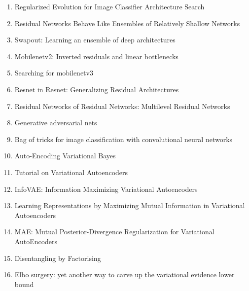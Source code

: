 \documentclass[acmlarge]{acmart}
\begin{document}
\begin{enumerate}
	\item Regularized Evolution for Image Classifier Architecture Search \cite{Real2019RegularizedEF} 

	\item Residual Networks Behave Like Ensembles of Relatively Shallow Networks \cite{Veit2016ResidualNB} 

	\item Swapout: Learning an ensemble of deep architectures \cite{Singh2016SwapoutLA} 

	\item Mobilenetv2: Inverted residuals and linear bottlenecks \cite{sandler2018mobilenetv2} 

	\item Searching for mobilenetv3 \cite{howard2019searching} 

	\item Resnet in Resnet: Generalizing Residual Architectures \cite{Targ2016ResnetIR} 

	\item Residual Networks of Residual Networks: Multilevel Residual Networks \cite{Zhang2018ResidualNO} 

	\item Generative adversarial nets \cite{goodfellow2014generative} 

	\item Bag of tricks for image classification with convolutional neural networks \cite{he2019bag} 

	\item Auto-Encoding Variational Bayes \cite{Kingma2014AutoEncodingVB} 

	\item Tutorial on Variational Autoencoders \cite{Doersch2016TutorialOV} 

	\item InfoVAE: Information Maximizing Variational Autoencoders \cite{zhao2017infovae} 

	\item Learning Representations by Maximizing Mutual Information in Variational Autoencoders \cite{LotfiRezaabad2020LearningRB} 

	\item MAE: Mutual Posterior-Divergence Regularization for Variational AutoEncoders \cite{Ma2019MAEMP} 

	\item Disentangling by Factorising \cite{Kim2018DisentanglingBF} 

	\item Elbo surgery: yet another way to carve up the variational evidence lower bound \cite{hoffman2016elbo} 


\end{enumerate}
\end{document}
